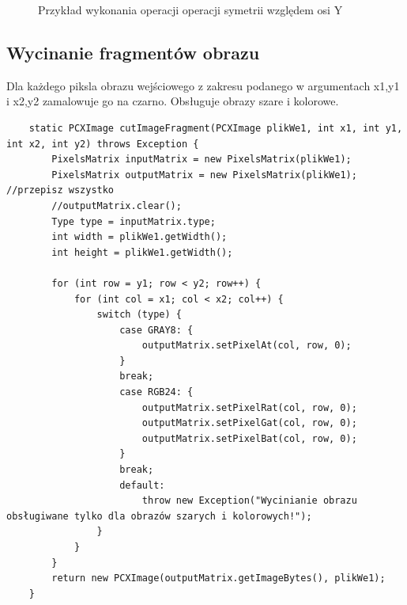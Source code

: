 \documentclass{article}
\begin{document}
\begin{figure}[!ht]
	\caption{Przykład wykonania operacji operacji symetrii względem osi Y}
	\label{fig12}	
	\end{figure}
	
	
	\subsection{Wycinanie fragmentów obrazu}
	Dla każdego piksla obrazu wejściowego z zakresu podanego w argumentach x1,y1 i x2,y2 zamalowuje go na czarno.
	Obsługuje obrazy szare i kolorowe.
	
	\begin{verbatim}
    static PCXImage cutImageFragment(PCXImage plikWe1, int x1, int y1, int x2, int y2) throws Exception {
        PixelsMatrix inputMatrix = new PixelsMatrix(plikWe1);
        PixelsMatrix outputMatrix = new PixelsMatrix(plikWe1);  //przepisz wszystko
        //outputMatrix.clear();
        Type type = inputMatrix.type;
        int width = plikWe1.getWidth();
        int height = plikWe1.getWidth();

        for (int row = y1; row < y2; row++) {
            for (int col = x1; col < x2; col++) {
                switch (type) {
                    case GRAY8: {
                        outputMatrix.setPixelAt(col, row, 0);
                    }
                    break;
                    case RGB24: {
                        outputMatrix.setPixelRat(col, row, 0);
                        outputMatrix.setPixelGat(col, row, 0);
                        outputMatrix.setPixelBat(col, row, 0);
                    }
                    break;
                    default:
                        throw new Exception("Wycinianie obrazu obsługiwane tylko dla obrazów szarych i kolorowych!");
                }
            }
        }
        return new PCXImage(outputMatrix.getImageBytes(), plikWe1);
    }
	\end{verbatim}
\end{document}
